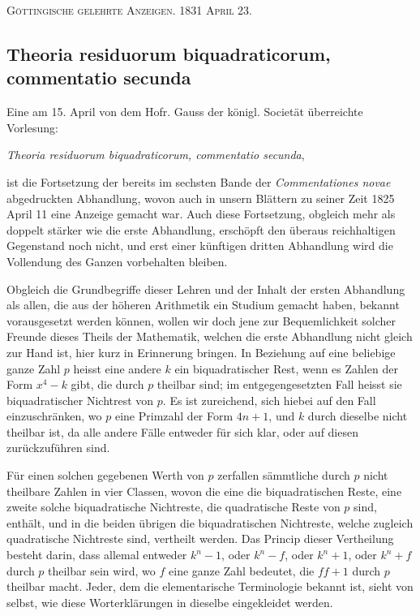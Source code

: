 \documentclass[12pt]{article}
\begin{document}
\begin{center}
\textsc{Göttingische gelehrte Anzeigen. 1831 April 23.}
\end{center}

\subsection*{Theoria residuorum biquadraticorum, commentatio secunda}

Eine am 15. April von dem Hofr. Gauss der königl. Societät überreichte Vorlesung:
\begin{center}\textit{Theoria residuorum biquadraticorum, commentatio secunda},\end{center}
ist die Fortsetzung der bereits im sechsten Bande der \textit{Commentationes novae} abgedruckten Abhandlung, wovon auch in unsern Blättern zu seiner Zeit 1825 April 11 eine Anzeige gemacht war. Auch diese Fortsetzung, obgleich mehr als doppelt stärker wie die erste Abhandlung, erschöpft den überaus reichhaltigen Gegenstand noch nicht, und erst einer künftigen dritten Abhandlung wird die Vollendung des Ganzen vorbehalten bleiben.

Obgleich die Grundbegriffe dieser Lehren und der Inhalt der ersten Abhandlung als allen, die aus der höheren Arithmetik ein Studium gemacht haben, bekannt vorausgesetzt werden können, wollen wir doch jene zur Bequemlichkeit solcher Freunde dieses Theils der Mathematik, welchen die erste Abhandlung nicht gleich zur Hand ist, hier kurz in Erinnerung bringen. In Beziehung auf eine beliebige ganze Zahl $p$ heisst eine andere $k$ ein biquadratischer Rest, wenn es Zahlen der Form $x^4-k$ gibt, die durch $p$ theilbar sind; im entgegengesetzten Fall heisst sie biquadratischer Nichtrest von $p$. Es ist zureichend, sich hiebei auf den Fall einzuschränken, wo $p$ eine Primzahl der Form $4n+1$, und $k$ durch dieselbe nicht theilbar ist, da alle andere Fälle entweder für sich klar, oder auf diesen zurückzuführen sind.

Für einen solchen gegebenen Werth von $p$ zerfallen sämmtliche durch $p$ nicht theilbare Zahlen in vier Classen, wovon die eine die biquadratischen Reste, eine zweite solche biquadratische Nichtreste, die quadratische Reste von $p$ sind, enthält, und in die beiden übrigen die biquadratischen Nichtreste, welche zugleich quadratische Nichtreste sind, vertheilt werden. Das Princip dieser Vertheilung besteht darin, dass allemal entweder $k^n-1$, oder $k^n-f$, oder $k^n+1$, oder $k^n+f$ durch $p$ theilbar sein wird, wo $f$ eine ganze Zahl bedeutet, die $ff+1$ durch $p$ theilbar macht. Jeder, dem die elementarische Terminologie bekannt ist, sieht von selbst, wie diese Worterklärungen in dieselbe eingekleidet werden.
\end{document}
